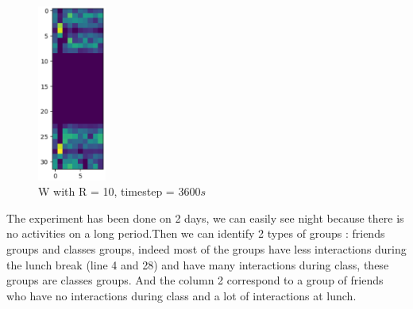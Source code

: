 \documentclass{article}
\begin{document}
\begin{figure}[H]
    \centering
    \includegraphics[width=0.2\textwidth]{images/W_R=10_t=3600.png}
    \caption{W with R = 10, timestep = 3600$s$}
\end{figure}

The experiment has been done on 2 days, we can easily see night because there is no activities on a long period.Then we can identify
2 types of groups : friends groups and classes groups, indeed most of the groups have less interactions during the lunch break (line 4 and 28)
and have many interactions during class, these groups are classes groups. And the column 2 correspond to a group of friends who have
no interactions during class and a lot of interactions at lunch.
\end{document}
